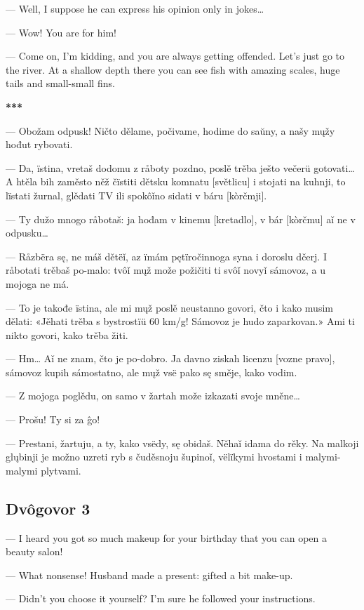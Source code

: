 — Well, I suppose he can express his opinion only in jokes…

— Wow! You are for him!

— Come on, I’m kidding, and you are always getting offended. Let’s just go to the river. At a shallow depth there you can see fish with amazing scales, huge tails and small-small fins.

\begin{center}
	\textbf{***}
\end{center}

— Obožam odpusk! Ničto dělame, počivame, hodime do saŭny, a našy mųžy hođut rybovati.

— Da, ïstina, vretaš dodomu z råboty pozdno, poslě trěba ješto večerü gotovati… A htěla bih zaměsto něž čïstiti dětsku komnatu [světlicu] i stojati na kuhnji, to lïstati žurnal, glědati TV ili spokôǐno sidati v báru [kòrčmji].

— Ty dužo mnogo råbotaš: ja hođam v kinemu [kretadlo], v bár [kòrčmu] aǐ ne v odpusku…

— Råzbëra sę, ne máš dětëǐ, az ïmám pętïročinnoga syna i doroslu dčerj. I råbotati trěbaš po-malo: tvôǐ mųž može požičiti ti svôǐ novyǐ sámovoz, a u mojoga ne má.

— To je takođe ïstina, ale mi mųž poslě neustanno govori, čto i kako musim dělati: «Jěhati trěba s bystrostïü 60 km/g! Sámovoz je hudo zaparkovan.» Ami ti nikto govori, kako trěba žiti.

— Hm… Aǐ ne znam, čto je po-dobro. Ja davno ziskah licenzu [vozne pravo], sámovoz kupih sámostatno, ale mųž vsë pako sę směje, kako vodim.

— Z mojoga poglědu, on samo v žartah može izkazati svoje mněne…

— Prošu! Ty si za ĝo!

— Prestani, žartuju, a ty, kako vsëdy, sę obidaš. Něhaǐ idama do rěky. Na malkoji glųbinji je možno uzreti ryb s čuděsnoju šupinoǐ, vëlïkymi hvostami i malymi-malymi plytvami.


\subsection{Dvôgovor 3}


— I heard you got so much makeup for your birthday that you can open a beauty salon!

— What nonsense! Husband made a present: gifted a bit make-up.

— Didn’t you choose it yourself? I’m sure he followed your instructions.

